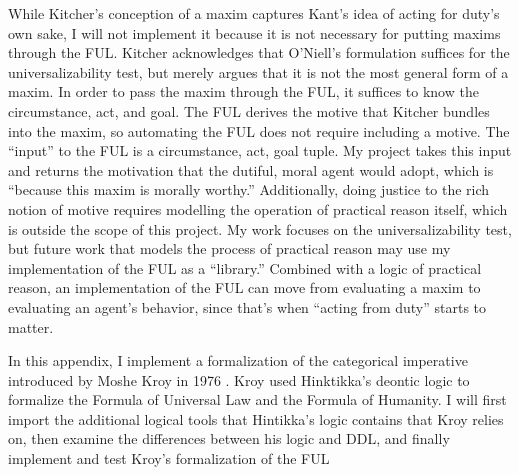 \begin{isabellebody}
\begin{isamarkuptext}
While Kitcher's conception of a maxim captures Kant's idea of acting for duty's own sake, I will not implement it 
because it is not necessary for putting maxims through the FUL. Kitcher acknowledges that 
O'Niell's formulation suffices for the universalizability test, but merely argues that it is not the most general form of a maxim.
In order to pass the maxim through the FUL, it suffices to know the circumstance, act, and goal. The FUL
derives the motive that Kitcher bundles into the maxim, so automating the FUL does not require 
including a motive. The ``input'' to the FUL is a circumstance, act, goal tuple. My project takes 
this input and returns the motivation that the dutiful, moral agent would adopt, which is ``because this
maxim is morally worthy.'' Additionally, doing
justice to the rich notion of motive requires modelling the operation of practical reason itself, 
which is outside the scope of this project. My work focuses on the universalizability test, but future work that 
models the process of practical reason may use my implementation of the FUL as a ``library.'' Combined 
with a logic of practical reason, an implementation of the FUL can move from evaluating a maxim to 
evaluating an agent's behavior, since that's when ``acting from duty'' starts to matter.%
\end{isamarkuptext}\isamarkuptrue%
%
\isadelimdocument
%
\endisadelimdocument
%
\isatagdocument
%
\endisatagdocument
{\isafolddocument}%
%
\isadelimdocument
%
\endisadelimdocument
%
\isadelimproof
%
\endisadelimproof
%
\isatagproof
%
\endisatagproof
{\isafoldproof}%
%
\isadelimproof
%
\endisadelimproof
%
\isadelimdocument
%
\endisadelimdocument
%
\isatagdocument
%
\isamarkuptrue%
%
\endisatagdocument
{\isafolddocument}%
%
\isadelimdocument
%
\endisadelimdocument
%
\begin{isamarkuptext}%
In this appendix, I implement a formalization of the categorical imperative introduced by Moshe Kroy in
1976 \citep{kroy}. Kroy used Hinktikka's deontic logic to formalize the Formula of Universal Law and
the Formula of Humanity. I will first import the additional logical tools that Hintikka's logic contains 
that Kroy relies on, then examine the differences between his logic and DDL, and finally implement 
and test Kroy's formalization of the FUL%
\end{isamarkuptext}\isamarkuptrue%
%
\isadelimdocument
%
\endisadelimdocument
%
\isatagdocument
%
\isamarkuptrue%

\end{isabellebody}
